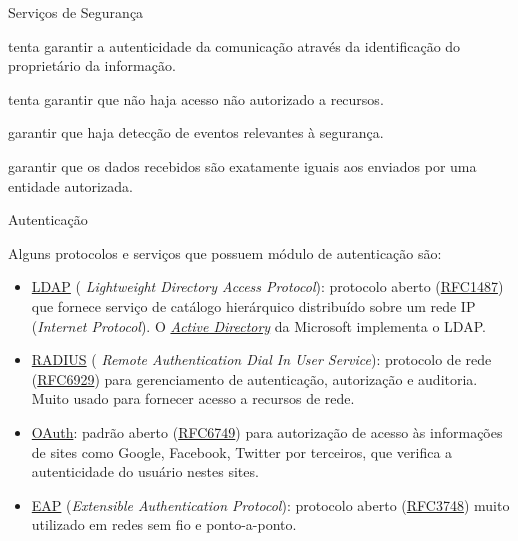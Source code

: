 
\begin{frame}{Serviços de Segurança}

  \begin{description}[<+->]
  \item[Autenticação:] tenta garantir a autenticidade da comunicação 
    através da identificação do proprietário da informação.
  \item[Autorização:] tenta garantir que não haja acesso não 
    autorizado a recursos. 
  \item[Auditoria:] garantir que haja detecção de eventos relevantes 
    à segurança.
  \item[Verificação de integridade:] garantir que os dados recebidos 
    são exatamente iguais aos enviados por uma entidade autorizada.
  \end{description}
  
\end{frame}


\begin{frame}{Autenticação}\small
  
  Alguns protocolos e serviços que possuem módulo de autenticação são:

  \begin{itemize}[<+->]
  \item \href{https://pt.wikipedia.org/wiki/LDAP}{LDAP} ({\em
      Lightweight Directory Access Protocol}): protocolo aberto
    (\href{http://goo.gl/IX8UPi}{RFC1487}) que fornece serviço de
    catálogo hierárquico distribuído sobre um rede IP ({\em Internet
      Protocol}). O
    \href{https://pt.wikipedia.org/wiki/Active_Directory}{\em Active
      Directory} da Microsoft implementa o LDAP.
  \item \href{https://pt.wikipedia.org/wiki/RADIUS}{RADIUS} ({\em
      Remote Authentication Dial In User Service}): protocolo de rede
    (\href{https://tools.ietf.org/html/rfc6929}{RFC6929}) para
    gerenciamento de autenticação, autorização e auditoria. Muito
    usado para fornecer acesso a recursos de rede.
  \item \href{https://en.wikipedia.org/wiki/OAuth}{OAuth}: padrão
    aberto (\href{https://tools.ietf.org/html/rfc6749}{RFC6749}) para
    autorização de acesso às informações de sites como Google,
    Facebook, Twitter por terceiros, que verifica a autenticidade do
    usuário nestes sites.
  \item
    \href{https://pt.wikipedia.org/wiki/Extensible_Authentication_Protocol}{EAP}
    ({\em Extensible Authentication Protocol}): protocolo aberto
    (\href{https://tools.ietf.org/html/rfc3748}{RFC3748}) muito
    utilizado em redes sem fio e ponto-a-ponto.
  \end{itemize}
  \end{frame}

